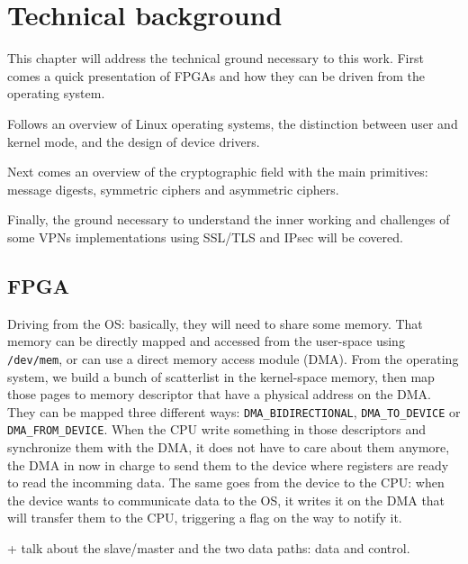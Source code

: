 \chapter{Technical background}\label{chap:theory}

This chapter will address the technical ground necessary to this work.
First comes a quick presentation of FPGAs and how they can be driven from the operating system.

\noindent Follows an overview of Linux operating systems, the distinction between user and kernel mode, and the design of device drivers.

\noindent Next comes an overview of the cryptographic field with the main primitives: message digests, symmetric ciphers and asymmetric ciphers.

\noindent Finally, the ground necessary to understand the inner working and challenges of some VPNs implementations using SSL/TLS and IPsec will be covered.



\section{FPGA}

Driving from the OS: basically, they will need to share some memory.
That memory can be directly mapped and accessed from the user-space using \texttt{/dev/mem}, or can use a direct memory access module (DMA).
From the operating system, we build a bunch of scatterlist in the kernel-space memory, then map those pages to memory descriptor that have a physical address on the DMA.
They can be mapped three different ways: \texttt{DMA\_BIDIRECTIONAL}, \texttt{DMA\_TO\_DEVICE} or \texttt{DMA\_FROM\_DEVICE}.
When the CPU write something in those descriptors and synchronize them with the DMA, it does not have to care about them anymore, the DMA in now in charge to send them to the device where registers are ready to read the incomming data.
The same goes from the device to the CPU: when the device wants to communicate data to the OS, it writes it on the DMA that will transfer them to the CPU, triggering a flag on the way to notify it.

+ talk about the slave/master and the two data paths: data and control.



